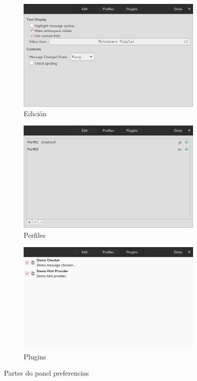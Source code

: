 \begin{figure}[h!]
  \centering
  \begin{subfigure}[b]{0.56\textwidth}
    \includegraphics[width=\textwidth]{img/panel_preferencias_edicion.png}
    \caption{Edición}
  \end{subfigure}
  \begin{subfigure}[b]{0.56\textwidth}
    \includegraphics[width=\textwidth]{img/panel_preferencias_perfiles.png}
    \caption{Perfiles}
  \end{subfigure}
  \begin{subfigure}[b]{0.56\textwidth}
    \includegraphics[width=\textwidth]{img/panel_preferencias_plugins.png}
    \caption{Plugins}
  \end{subfigure}
    \caption{Partes do panel preferencias}
    \label{fig:ui:panel:preferences}
\end{figure}

